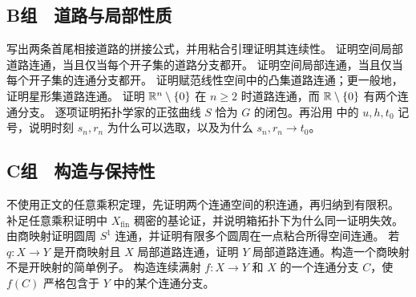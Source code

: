 \subsection*{B组　道路与局部性质}
\begin{enumerate}[label=\textbf{\thechapter.\arabic*.},resume]
 写出两条首尾相接道路的拼接公式，并用粘合引理证明其连续性。
 证明空间局部道路连通，当且仅当每个开子集的道路分支都开。
 证明空间局部连通，当且仅当每个开子集的连通分支都开。
 证明赋范线性空间中的凸集道路连通；更一般地，证明星形集道路连通。
 证明 \(\mathbb{R}^n\setminus\{0\}\) 在 \(n\ge2\) 时道路连通，而 \(\mathbb{R}\setminus\{0\}\) 有两个连通分支。
 逐项证明拓扑学家的正弦曲线 \(S\) 恰为 \(G\) 的闭包。再沿用
  中的
 \(u,h,t_0\) 记号，说明时刻 \(s_n,r_n\) 为什么可以选取，以及为什么
 \(s_n,r_n\to t_0\)。
\end{enumerate}

\subsection*{C组　构造与保持性}
\begin{enumerate}[label=\textbf{\thechapter.\arabic*.},resume]
 不使用正文的任意乘积定理，先证明两个连通空间的积连通，再归纳到有限积。
 补足任意乘积证明中 \(X_{\mathrm{fin}}\) 稠密的基论证，并说明箱拓扑下为什么同一证明失效。
 由商映射证明圆周 \(S^1\) 连通，并证明有限多个圆周在一点粘合所得空间连通。
 若 \(q:X\to Y\) 是开商映射且 \(X\) 局部道路连通，证明 \(Y\) 局部道路连通。构造一个商映射不是开映射的简单例子。
 构造连续满射 \(f:X\to Y\) 和 \(X\) 的一个连通分支 \(C\)，使 \(f(C)\) 严格包含于 \(Y\) 中的某个连通分支。
\end{enumerate}
